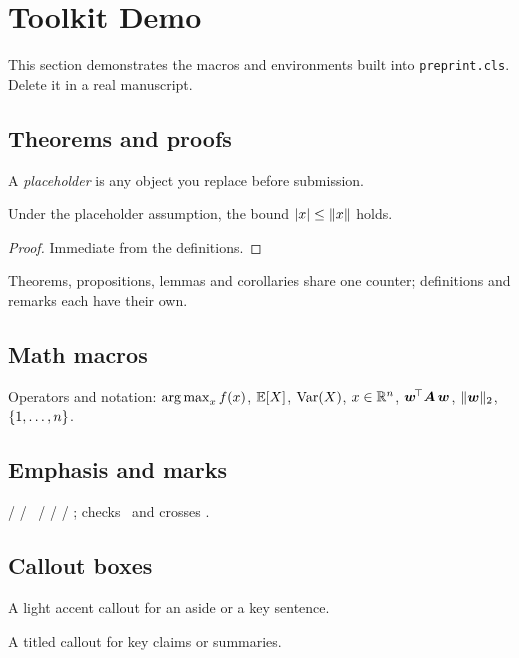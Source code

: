 \section*{Toolkit Demo}\label{s:toolkit}
This section demonstrates the macros and environments built into
\texttt{preprint.cls}. Delete it in a real manuscript.

\subsection*{Theorems and proofs}
\begin{definition}\label{def:demo}
A \emph{placeholder} is any object you replace before submission.
\end{definition}
\begin{theorem}\label{thm:demo}
Under the placeholder assumption, the bound $\lvert x\rvert\le\lVert x\rVert$ holds.
\end{theorem}
\begin{proof}
Immediate from the definitions.
\end{proof}
\begin{remark}
Theorems, propositions, lemmas and corollaries share one counter; definitions
and remarks each have their own.
\end{remark}

\subsection*{Math macros}
Operators and notation:
$\operatorname*{arg\,max}_x f(x)$, $\mathbb{E}[X]$, $\operatorname{Var}(X)$, $x \in \mathbb{R}^n$,
$\bm{w}^{\!\top} \bm{A}\, \bm{w}$, $\lVert\bm{w}\rVert_2$, $\{1,\dots,n\}$.

\subsection*{Emphasis and marks}
 /  / \maybe\ /  /  /
; checks \cmark\ and crosses \xmark.

\subsection*{Callout boxes}
\begin{highlight}
A light accent callout for an aside or a key sentence.
\end{highlight}
\begin{keypoint}[Takeaway]
A titled callout for key claims or summaries.
\end{keypoint}

